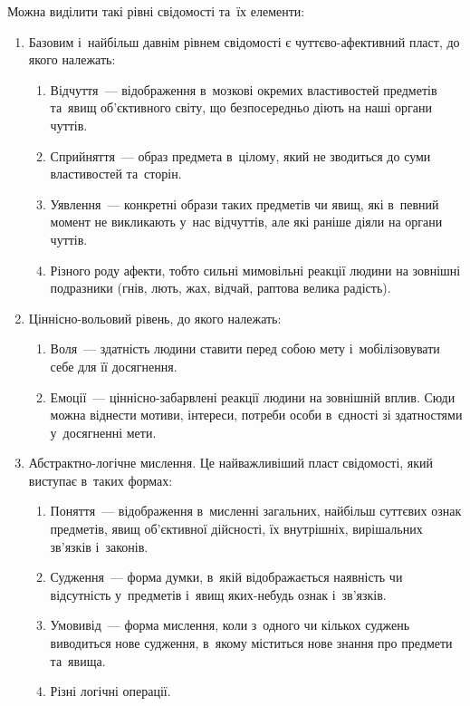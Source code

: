 \documentclass[a5paper,oneside,DIV=12,12pt,headings=small]{scrartcl}
\begin{document}
		Можна виділити такі рівні свідомості та~їх елементи:
		\begin{enumerate}
			\item Базовим і~найбільш давнім рівнем свідомості є чут\-тє\-во-афек\-тив\-ний пласт, до якого належать:
			\begin{enumerate}
				\item Відчуття~— відображення в~мозкові окремих властивостей предметів та~явищ об'\-єк\-тив\-но\-го світу, що безпосередньо діють на наші органи чуттів.
				\item Сприйняття~— образ предмета в~цілому, який не зводиться до суми властивостей та~сторін.
				\item Уявлення~— конкретні образи таких предметів чи явищ, які в~певний момент не викликають у~нас відчуттів, але які раніше діяли на органи чуттів.
				\item Різного роду афекти, тобто сильні мимовільні реакції людини на зовнішні подразники (гнів, лють, жах, відчай, раптова велика радість).
			\end{enumerate}

			\item Ціннісно-вольовий рівень, до якого належать:
			\begin{enumerate}
				\item Воля~— здатність людини ставити перед собою мету і~мобілізовувати себе для її досягнення.
				\item Емоції~— ціннісно-забарвлені реакції людини на зовнішній вплив. Сюди можна віднести мотиви, інтереси, потреби особи в~єдності зі здатностями у~досягненні мети.
			\end{enumerate}

			\item Абстрактно-логічне мислення. Це найважливіший пласт свідомості, який виступає в~таких формах:
			\begin{enumerate}
				\item Поняття~— відображення в~мисленні загальних, найбільш суттєвих ознак предметів, явищ об'\-єк\-тив\-ної дійсності, їх внутрішніх, вирішальних зв'\-яз\-ків і~законів.
				\item Судження~— форма думки, в~якій відображається наявність чи відсутність у~предметів і~явищ яких-небудь ознак і~зв'\-яз\-ків.
				\item Умовивід~— форма мислення, коли з~одного чи кількох суджень виводиться нове судження, в~якому міститься нове знання про предмети та~явища.
				\item Різні логічні операції.
			\end{enumerate}


\end{enumerate}
\end{document}
